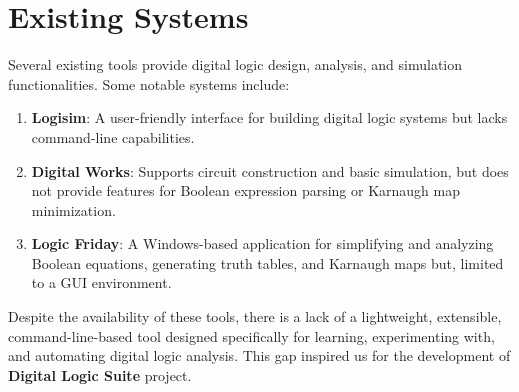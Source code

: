 \section{Existing Systems}
Several existing tools provide digital logic design, analysis, and simulation functionalities. Some notable systems include:

\renewcommand{\labelenumi}{\roman{enumi}.}
\begin{enumerate}
    \item \textbf{Logisim}: A user-friendly interface for building digital logic systems but lacks command-line capabilities.

    \item \textbf{Digital Works}: Supports circuit construction and basic simulation, but does not provide features for Boolean expression parsing or Karnaugh map minimization.

    \item \textbf{Logic Friday}: A Windows-based application for simplifying and analyzing Boolean equations, generating truth tables, and Karnaugh maps but, limited to a GUI environment.
\end{enumerate}

\vspace{0.5em}

Despite the availability of these tools, there is a lack of a lightweight, extensible, command-line-based tool designed specifically for learning, experimenting with, and automating digital logic analysis. This gap inspired us for the development of \textbf{Digital Logic Suite} project.

